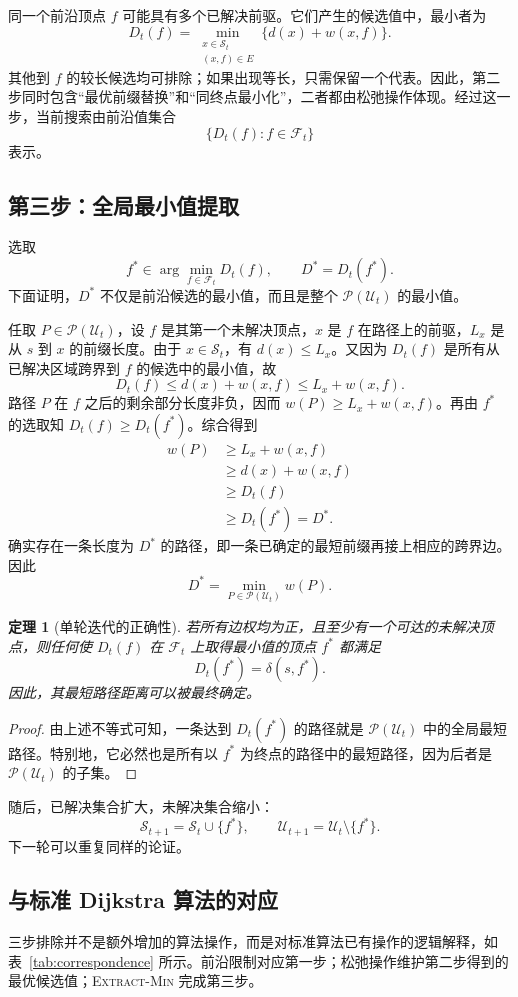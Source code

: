 \documentclass[UTF8,11pt,a4paper]{ctexart}
\newtheorem{theorem}{定理}
\newcommand{\Sset}{\mathcal S_t}
\newcommand{\Uset}{\mathcal U_t}
\newcommand{\Fset}{\mathcal F_t}
\newcommand{\PathU}{\mathcal P(\mathcal U_t)}
\begin{document}
同一个前沿顶点 $f$ 可能具有多个已解决前驱。它们产生的候选值中，最小者为
\[
  D_t(f)=\min_{\substack{x\in\Sset\\(x,f)\in E}}
  \{d(x)+w(x,f)\}.
\]
其他到 $f$ 的较长候选均可排除；如果出现等长，只需保留一个代表。因此，第二步同时包含“最优前缀替换”和“同终点最小化”，二者都由松弛操作体现。经过这一步，当前搜索由前沿值集合
\[
  \{D_t(f):f\in\Fset\}
\]
表示。

\subsection{第三步：全局最小值提取}
选取
\[
 f^*\in\arg\min_{f\in\Fset}D_t(f),
 \qquad D^*=D_t(f^*).
\]
下面证明，$D^*$ 不仅是前沿候选的最小值，而且是整个 $\PathU$ 的最小值。

任取 $P\in\PathU$，设 $f$ 是其第一个未解决顶点，$x$ 是 $f$ 在路径上的前驱，$L_x$ 是从 $s$ 到 $x$ 的前缀长度。由于 $x\in\Sset$，有 $d(x)\le L_x$。又因为 $D_t(f)$ 是所有从已解决区域跨界到 $f$ 的候选中的最小值，故
\[
 D_t(f)\le d(x)+w(x,f)\le L_x+w(x,f).
\]
路径 $P$ 在 $f$ 之后的剩余部分长度非负，因而 $w(P)\ge L_x+w(x,f)$。再由 $f^*$ 的选取知 $D_t(f)\ge D_t(f^*)$。综合得到
\[
 \begin{aligned}
 w(P)&\ge L_x+w(x,f)\\
     &\ge d(x)+w(x,f)\\
     &\ge D_t(f)\\
     &\ge D_t(f^*)=D^*.
 \end{aligned}
\]
确实存在一条长度为 $D^*$ 的路径，即一条已确定的最短前缀再接上相应的跨界边。因此
\[
  D^*=\min_{P\in\PathU} w(P).
\]

\begin{theorem}[单轮迭代的正确性]\label{thm:iteration}
若所有边权均为正，且至少有一个可达的未解决顶点，则任何使 $D_t(f)$ 在 $\Fset$ 上取得最小值的顶点 $f^*$ 都满足
\[
  D_t(f^*)=\delta(s,f^*).
\]
因此，其最短路径距离可以被最终确定。
\end{theorem}
\begin{proof}
由上述不等式可知，一条达到 $D_t(f^*)$ 的路径就是 $\PathU$ 中的全局最短路径。特别地，它必然也是所有以 $f^*$ 为终点的路径中的最短路径，因为后者是 $\PathU$ 的子集。
\end{proof}

随后，已解决集合扩大，未解决集合缩小：
\[
 \mathcal S_{t+1}=\Sset\cup\{f^*\},\qquad
 \mathcal U_{t+1}=\Uset\setminus\{f^*\}.
\]
下一轮可以重复同样的论证。

\subsection{与标准 Dijkstra 算法的对应}
\label{sec:correspondence}
三步排除并不是额外增加的算法操作，而是对标准算法已有操作的逻辑解释，如表~\ref{tab:correspondence} 所示。前沿限制对应第一步；松弛操作维护第二步得到的最优候选值；\textsc{Extract-Min} 完成第三步。
\end{document}
